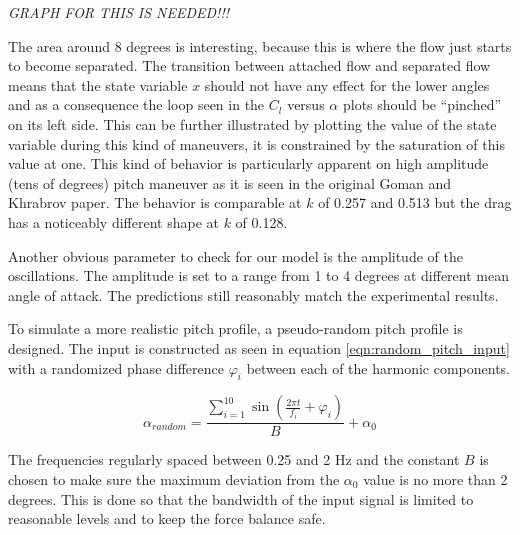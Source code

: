 \FloatBarrier

\emph{GRAPH FOR THIS IS NEEDED!!!}

\par The area around 8 degrees is interesting, because this is where the flow just starts to become separated.
The transition between attached flow and separated flow means that the state variable $x$ should not have any effect for the lower angles and as a consequence the loop seen in the $C_l$ versus $\alpha$ plots should be ``pinched'' on its left side.
This can be further illustrated by plotting the value of the state variable during this kind of maneuvers, it is constrained by the saturation of this value at one.
This kind of behavior is particularly apparent on high amplitude (tens of degrees) pitch maneuver as it is seen in the original Goman and Khrabrov paper.
The behavior is comparable at $k$ of 0.257 and 0.513 but the drag has a noticeably different shape at $k$ of 0.128.

\par Another obvious parameter to check for our model is the amplitude of the oscillations.
The amplitude is set to a range from 1 to 4 degrees at different mean angle of attack.
The predictions still reasonably match the experimental results. 


To simulate a more realistic pitch profile, a pseudo-random pitch profile is designed.
The input is constructed as seen in equation \ref{eqn:random_pitch_input} with a randomized phase difference $\varphi_i$ between each of the harmonic components.

\begin{equation}
	\alpha_{random}= \frac{\sum_{i=1}^{10} \sin (\frac{2 \pi t}{f_i} + \varphi_i)}{B} + \alpha_{0}
	\label{eqn:random_pitch_input}
\end{equation}

The frequencies regularly spaced between 0.25 and 2 Hz and the constant $B$ is chosen to make sure the maximum deviation from the $\alpha_0$ value is no more than 2 degrees.
This is done so that the bandwidth of the input signal is limited to reasonable levels and to keep the force balance safe.

